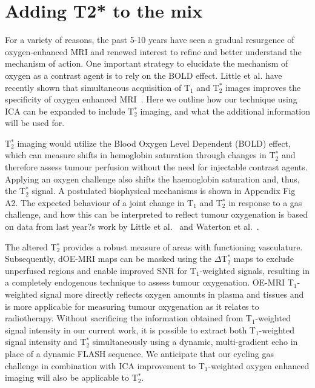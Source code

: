 \section{Adding T2* to the mix}

For a variety of reasons, the past 5-10 years have seen a gradual resurgence of oxygen-enhanced MRI and renewed interest to refine and better understand the mechanism of action.
One important strategy to elucidate the mechanism of oxygen as a contrast agent is to rely on the \acs{BOLD} effect. 
Little et al. have recently shown that simultaneous acquisition of T$_1$ and T$_2^*$ images improves the specificity of oxygen enhanced MRI~\cite{Little:2018iu}.
Here we outline how our technique using \acs{ICA} can be expanded to include T$_2^*$ imaging, and what the additional information will be used for.

T$_2^*$ imaging would utilize the Blood Oxygen Level Dependent (\acs{BOLD}) effect, which can measure shifts in hemoglobin saturation through changes in T$_2^*$ and therefore assess tumour perfusion without the need for injectable contrast agents. 
Applying an oxygen challenge also shifts the haemoglobin saturation and, thus, the T$_2^*$ signal. 
A postulated biophysical mechanisms is shown in Appendix Fig A2. 
The expected behaviour of a joint change in T$_1$ and T$_2^*$ in response to a gas challenge, and how this can be interpreted to reflect tumour oxygenation is based on data from last year?s work by Little et al.~\cite{Little:2018iu} and Waterton et al.~\cite{OConnor:2019fc}. 

The altered T$_2^*$ provides a robust measure of areas with functioning vasculature. 
Subsequently, \acs{dOE-MRI} maps can be masked using the $\Delta$T$_2^*$ maps to exclude unperfused regions and enable improved \acs{SNR} for T$_1$-weighted signals, resulting in a completely endogenous technique to assess tumour oxygenation. 
OE-MRI T$_1$-weighted signal more directly reflects oxygen amounts in plasma and tissues and is more applicable for measuring tumour oxygenation as it relates to radiotherapy.
Without sacrificing the information obtained from T$_1$-weighted signal intensity in our current work, it is possible to extract both T$_1$-weighted signal intensity and T$_2^*$ simultaneously using a dynamic, multi-gradient echo in place of a dynamic FLASH sequence. 
We anticipate that our cycling gas challenge in combination with \acs{ICA} improvement to T$_1$-weighted oxygen enhanced imaging will also be applicable to T$_2^*$.

